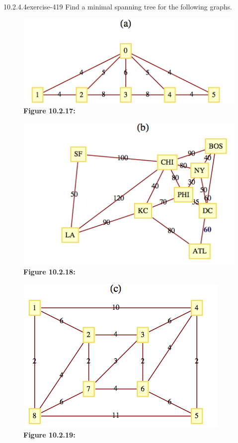 \documentclass[twoside,10pt,]{book}
\numberwithin{equation}{section}
\begin{document}
\begin{divisionsolution}{10.2.4.4}{}{exercise-419}%
\hypertarget{p-3602}{}%
Find a minimal spanning tree for the following graphs.%
\begin{figure}
\centering
\includegraphics[width=0.8\linewidth]{images/fig-exercise-10-2-4a.png}
\caption*{\textbf{Figure 10.2.17:} }
\end{figure}
\begin{figure}
\centering
\includegraphics[width=0.8\linewidth]{images/fig-exercise-10-2-4b.png}
\caption*{\textbf{Figure 10.2.18:} }
\end{figure}
\begin{figure}
\centering
\includegraphics[width=0.7\linewidth]{images/fig-exercise-10-2-4c.png}
\caption*{\textbf{Figure 10.2.19:} }
\end{figure}
\end{divisionsolution}%
\end{document}
